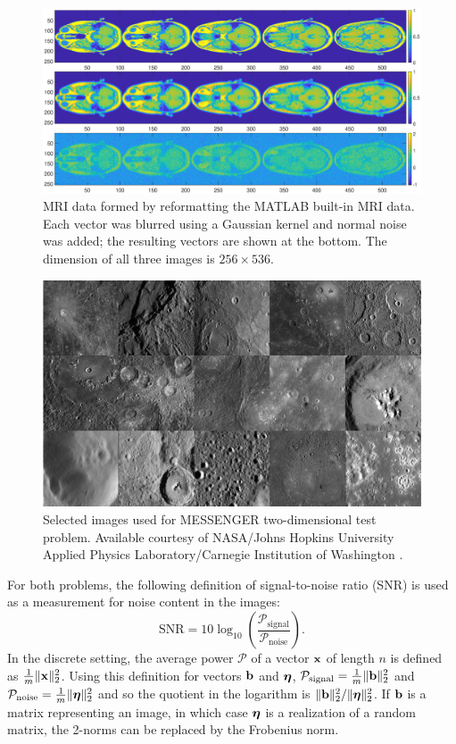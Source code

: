 \documentclass[12pt]{article}
\begin{document}
\begin{figure}[!ht]%
\includegraphics[scale=0.32]{Figures/Full_MRI_Data.eps}
\caption{MRI data formed by reformatting the MATLAB built-in MRI data. Each vector was blurred using a Gaussian kernel and normal noise was added; the resulting vectors are shown at the bottom. The dimension of all three images is $256 \times 536$.}
\label{fig:MRI 1D}
\end{figure}



\begin{figure}[ht]
\includegraphics[width=1.0\textwidth]{Figures/MESSENGER.pdf}
\caption{Selected images used for MESSENGER two-dimensional test problem. Available courtesy of NASA/Johns  Hopkins  University  Applied  Physics  Laboratory/Carnegie Institution of Washington \cite{MESSENGER}.}
\label{fig:MESSENGER True}
\end{figure}


For both problems, the following definition of signal-to-noise ratio (SNR) is used as a measurement for noise content in the images:
\begin{equation}
\label{eq:SNR}
\text{SNR} = 10\log_{10}\left(\frac{\mathcal{P}_{\text{signal}}}{\mathcal{P}_{\text{noise}}}\right).
\end{equation}
In the discrete setting, the average power $\mathcal{P}$ of a vector $\mathbf{x}$ of length $n$ is defined as $\frac{1}{m}\|\mathbf{x}\|^2_2$. Using this definition for vectors $\mathbf{b}$ and $\bm{\eta}$, $\mathcal{P}_{\text{signal}} = \frac{1}{m}\|\mathbf{b}\|^2_2$ and $\mathcal{P}_{\text{noise}} = \frac{1}{m}\|\bm{\eta}\|^2_2$ and so the quotient in the logarithm is $\|\mathbf{b}\|_2^2/\|\bm{\eta}\|_2^2$. If $\mathbf{b}$ is a matrix representing an image, in which case $\bm{\eta}$ is a realization of a random matrix, the 2-norms can be replaced by the Frobenius norm.
\end{document}
